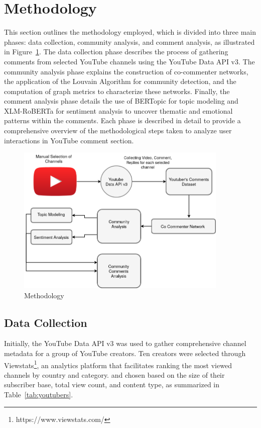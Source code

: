 \documentclass[12pt]{article}
\begin{document}
\section{Methodology}

This section outlines the methodology employed, which is divided into three main phases: 
data collection, community analysis, and comment analysis, as illustrated in Figure~\ref{fig:methodology}. 
The data collection phase describes the process of gathering comments from selected YouTube channels 
using the YouTube Data API v3. The community analysis phase explains the construction of co-commenter 
networks, the application of the Louvain Algorithm for community detection, and the computation of 
graph metrics to characterize these networks. Finally, the comment analysis phase details the use of 
BERTopic for topic modeling and XLM-RoBERTa for sentiment analysis to uncover thematic and emotional 
patterns within the comments. Each phase is described in detail to provide a comprehensive overview 
of the methodological steps taken to analyze user interactions in YouTube comment section.

\begin{figure}[t!]
    \centering
    \includegraphics[keepaspectratio,width=0.9\textwidth]{./imgs/tcc_methodology.png}
    \caption{Methodology}
    \label{fig:methodology}
\end{figure}

\subsection{Data Collection}

Initially, the YouTube Data API v3 was used to gather comprehensive channel metadata for a group of YouTube creators. 
Ten creators were selected through Viewstats\footnote{https://www.viewstats.com/}, an analytics platform 
that facilitates ranking the most viewed channels by country and category.
and chosen based on the size of their subscriber base, total view count, and content type, as summarized in 
Table~\ref{tab:youtubers}.
\end{document}
